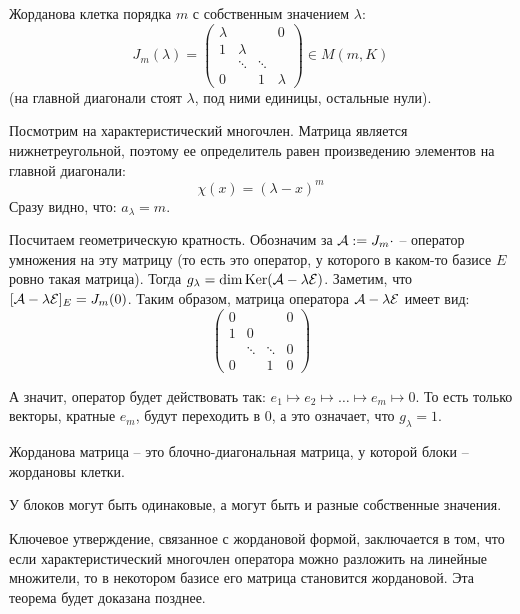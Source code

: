 \begin{conj}
    Жорданова клетка порядка $m$ с собственным значением $\lambda$: 
    \[ J_m(\lambda) = \left(\begin{array}{cccc}
    \lambda &  &  & 0 \\ 
    1 & \lambda &  &  \\ 
     & \ddots & \ddots &  \\ 
    0 &  & 1 & \lambda
    \end{array}\right) \in M(m, K) \]
    (на главной диагонали стоят $\lambda$, под ними единицы, остальные нули).
\end{conj}

\vspace*{3mm}

Посмотрим на характеристический многочлен.
Матрица является нижнетреугольной, поэтому ее определитель равен произведению элементов на главной диагонали:
    \[  \chi(x) = (\lambda - x)^m \]
Сразу видно, что: $a_{\lambda} = m$.

Посчитаем геометрическую кратность. 
Обозначим за $\mathcal{A} := J_m \cdot$ -- оператор умножения на эту матрицу (то есть это оператор, у которого в каком-то базисе $E$ ровно такая матрица).
Тогда $ g_{\lambda} = \dim \operatorname{Ker}(\mathcal{A} - \lambda\mathcal{E})$. 
Заметим, что $[\mathcal{A} - \lambda\mathcal{E}]_E = J_{m}(0)$.
Таким образом, матрица оператора $\mathcal{A} - \lambda\mathcal{E}$ имеет вид:
\[ \left(\begin{array}{cccc}
0 &  &  & 0 \\
1 & 0 &  &  \\
 & \ddots & \ddots & 0 \\ 
0 &  & 1 & 0
\end{array}\right) \]

А значит, оператор будет действовать так: $e_1 \mapsto e_2 \mapsto \dots \mapsto e_m \mapsto 0$.
То есть только векторы, кратные $e_m$, будут переходить в 0, а это означает, что $g_\lambda = 1$.

\vspace*{4mm}

\begin{conj}
    Жорданова матрица -- это блочно-диагональная матрица, у которой блоки -- жордановы клетки.
\end{conj}
У блоков могут быть одинаковые, а могут быть и разные собственные значения.

Ключевое утверждение, связанное с жордановой формой, заключается в том, что 
если характеристический многочлен оператора можно разложить на линейные множители,
то в некотором базисе его матрица становится жордановой.
Эта теорема будет доказана позднее.

